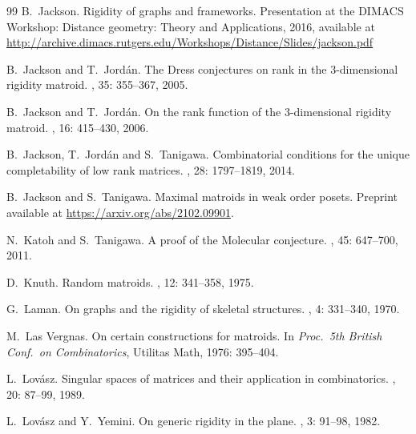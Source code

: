 \documentclass{daj}
\begin{document}
\begin{thebibliography}{99}
 B.~Jackson. 
\newblock 
Rigidity of graphs and frameworks.  Presentation at the DIMACS Workshop: Distance geometry: Theory and Applications,  2016,  available at\\
\url{http://archive.dimacs.rutgers.edu/Workshops/Distance/Slides/jackson.pdf}



B.~Jackson and T.~Jord{\'a}n. 
\newblock 
The Dress conjectures on rank in the 3-dimensional rigidity matroid.
,  35: 355--367, 2005.


 B.~Jackson and T.~Jord{\'a}n. 
\newblock 
On the rank function of the 3-dimensional rigidity matroid.
, 16: 415--430, 2006.


B.~Jackson, T.~Jord{\'a}n and S.~Tanigawa. 
\newblock 
Combinatorial conditions for the unique completability of low rank matrices.
, 28:  1797--1819, 2014.

B.~Jackson and S.~Tanigawa. 
\newblock 
Maximal matroids in weak order posets. Preprint available at \url{https://arxiv.org/abs/2102.09901}.


N.~Katoh and S.~Tanigawa. 
\newblock  
A proof of the Molecular conjecture.
, 45: 647--700, 2011.

D.~Knuth. 
\newblock  Random matroids.
, 12: 341--358, 1975.

G.~Laman. 
\newblock  On graphs and the rigidity of skeletal structures.
,
4: 331--340,   1970.

M.~Las Vergnas. 
\newblock  On certain constructions for matroids. In {\em Proc.~5th British Conf.~on Combinatorics},
Utilitas Math,  1976: 395--404.

L.~Lov{\'a}sz. 
\newblock  Singular spaces of matrices and their application in combinatorics.
, 20: 87--99, 1989.

L.~Lov{\'a}sz and Y.~Yemini. 
\newblock  On generic rigidity in the plane.
, 3: 91--98, 1982.


\end{thebibliography}
\end{document}
